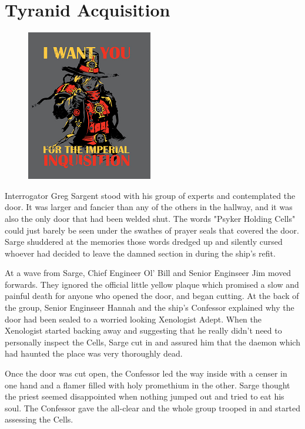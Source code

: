 \chapter{Tyranid Acquisition}

\begin{figure}
	\begin{center}
		\includegraphics[width=\figwidth]{pics/12/1.png}
	\end{center}
\end{figure}
Interrogator Greg Sargent stood with his group of experts and contemplated the door. 
It was larger and fancier than any of the others in the hallway, and it was also the only door that had been welded shut. 
The words "Psyker Holding Cells" could just barely be seen under the swathes of prayer seals that covered the door. 
Sarge shuddered at the memories those words dredged up and silently cursed whoever had decided to leave the damned section in during the ship's refit.

At a wave from Sarge, Chief Engineer Ol' Bill and Senior Enginseer Jim moved forwards. 
They ignored the official little yellow plaque which promised a slow and painful death for anyone who opened the door, and began cutting. 
At the back of the group, Senior Enginseer Hannah and the ship's Confessor explained why the door had been sealed to a worried looking Xenologist Adept. 
When the Xenologist started backing away and suggesting that he really didn't need to personally inspect the Cells, Sarge cut in and assured him that the daemon which had haunted the place was very thoroughly dead.

Once the door was cut open, the Confessor led the way inside with a censer in one hand and a flamer filled with holy promethium in the other. 
Sarge thought the priest seemed disappointed when nothing jumped out and tried to eat his soul. 
The Confessor gave the all-clear and the whole group trooped in and started assessing the Cells.

